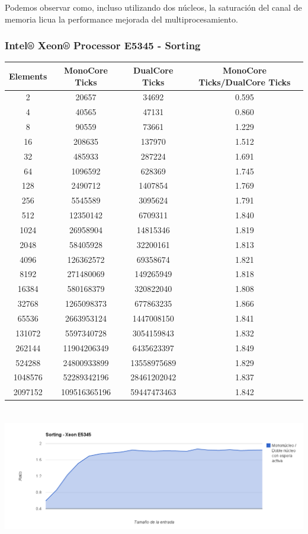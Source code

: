 Podemos observar como, incluso utilizando dos núcleos, la saturación del canal de memoria licua la performance mejorada del multiprocesamiento.

\subsubsection{Intel® Xeon® Processor E5345 - Sorting}
\begin{tabular}{|c|c|c|c|}
	\hline
		Elements & MonoCore Ticks & DualCore Ticks & MonoCore Ticks/DualCore Ticks\\
	\hline
		2 & 20657 & 34692 & 0.595\\
	\hline
		4 & 40565 & 47131 & 0.860\\
	\hline
		8 & 90559 & 73661 & 1.229\\
	\hline
		16 & 208635 & 137970 & 1.512\\
	\hline
		32 & 485933 & 287224 & 1.691\\
	\hline
		64 & 1096592 & 628369 & 1.745\\
	\hline
		128 & 2490712 & 1407854 & 1.769\\
	\hline
		256 & 5545589 & 3095624 & 1.791\\
	\hline
		512 & 12350142 & 6709311 & 1.840\\
	\hline
		1024 & 26958904 & 14815346 & 1.819\\
	\hline
		2048 & 58405928 & 32200161 & 1.813\\
	\hline
		4096 & 126362572 & 69358674 & 1.821\\
	\hline
		8192 & 271480069 & 149265949 & 1.818\\
	\hline
		16384 & 580168379 & 320822040 & 1.808\\
	\hline
		32768 & 1265098373 & 677863235 & 1.866\\
	\hline
		65536 & 2663953124 & 1447008150 & 1.841\\
	\hline
		131072 & 5597340728 & 3054159843 & 1.832\\
	\hline
		262144 & 11904206349 & 6435623397 & 1.849\\
	\hline
		524288 & 24800933899 & 13558975689 & 1.829\\
	\hline
		1048576 & 52289342196 & 28461202042 & 1.837\\
	\hline
		2097152 & 109516365196 & 59447473463 & 1.842\\
	\hline
\end{tabular}

	\begin{center}
	    \includegraphics[height=6cm]{images/XEON_Sorting.png}
	\end{center}

